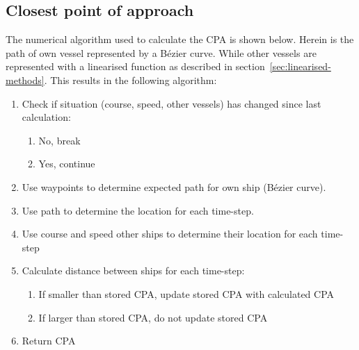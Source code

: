 \subsection{Closest point of approach}
\label{ssec:CPA-calculation}
The numerical algorithm used to calculate the CPA is shown below. Herein is the path of own vessel represented by a Bézier curve. While other vessels are represented with a linearised function as described in section~\ref{sec:linearised-methods}. This results in the following algorithm:
\begin{enumerate}
	\item Check if situation (course, speed, other vessels) has changed since last calculation:
	\begin{enumerate}
		\item No, break
		\item Yes, continue
	\end{enumerate}
	\item Use waypoints to determine expected path for own ship (Bézier curve).
	\item Use path to determine the location for each time-step.
	\item Use course and speed other ships to determine their location for each time-step
	\item Calculate distance between ships for each time-step:
	\begin{enumerate}
		\item If smaller than stored CPA, update stored CPA with calculated CPA
		\item If larger than stored CPA, do not update stored CPA
	\end{enumerate}
	\item Return CPA
\end{enumerate}

